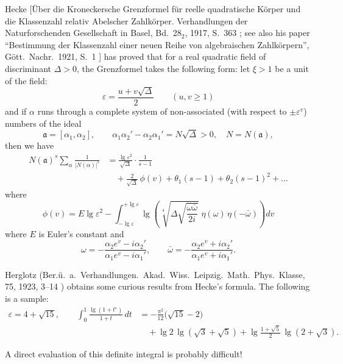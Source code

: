 Hecke [\"Uber die Kroneckersche Grenzformel f\"ur reelle quadratische
K\"orper und die Klassenzahl relativ Abelscher Zahlk\"orper.
Verhandlungen der Naturforschenden Gesellschaft in Basel, Bd.\ 28$_{2}$,
1917, S.~363 \cite{hecke1917kroneckersche}; see also his paper
``Bestimmung der Klassenzahl einer neuen Reihe von algebraischen
Zahlk\"orpern'', G\"ott.\ Nachr.\ 1921, S.~1 \cite{hecke1921bestimmung}]
has proved that for a real quadratic field of discriminant $\Delta>0$,
the Grenzformel takes the following form: let $\xi>1$ be a unit of the
field:
\[
\varepsilon=\frac{u+v\sqrt{\Delta}}{2}\qquad(u,v\geq 1)
\]
and if $\alpha$ runs through a complete system of non-associated (with
respect to $\pm\varepsilon^{v}$) numbers of the ideal
\[
\mathfrak{a}=[\alpha_{1},\alpha_{2}],\qquad
\alpha_{1}\alpha_{2}'-\alpha_{2}\alpha_{1}'=N\sqrt{\Delta}>0,\quad
N=N(\mathfrak{a}),
\]
then we have
\[
\begin{aligned}
N(\mathfrak{a})^{s}\sum_{\alpha}\frac{1}{|N(\alpha)|^{s}}
&=\frac{\lg\varepsilon^{2}}{\sqrt{\Delta}}\cdot\frac{1}{s-1}\\
&\quad+\frac{2}{\sqrt{\Delta}}\,\phi(v)+\theta_{1}(s-1)
+\theta_{2}(s-1)^{2}+\dots
\end{aligned}
\]
where
\[
\phi(v)=E\lg\varepsilon^{2}
-\int_{-\lg\varepsilon}^{+\lg\varepsilon}
\lg\!\left(\sqrt[4]{\Delta\sqrt{\frac{\omega\bar{\omega}}{2i}}}\;
\eta(\omega)\,\eta(-\bar{\omega})\right)dv
\]
where $E$ is Euler's constant and
\[
\omega=-\frac{\alpha_{2}e^{v}-i\alpha_{2}'}{\alpha_{1}e^{v}-i\alpha_{1}'},
\qquad
\bar{\omega}=-\frac{\alpha_{2}e^{v}+i\alpha_{2}'}{\alpha_{1}e^{v}+i\alpha_{1}'}.
\]

Herglotz (Ber.\"u.\ a.\ Verhandlungen.\ Akad.\ Wiss.\ Leipzig.\ Math.\
Phys.\ Klasse, 75, 1923, 3--14 \cite{herglotz1923bestimmung}) obtains
some curious results from Hecke's formula. The following is a sample:
\[
\begin{aligned}
\varepsilon=4+\sqrt{15},\qquad
\int_{0}^{1}\frac{\lg(1+t^{\varepsilon})}{1+t}\,dt
&=-\frac{\pi^{2}}{12}\bigl(\sqrt{15}-2\bigr)\\
&\quad+\lg 2\,\lg(\sqrt{3}+\sqrt{5})
+\lg\frac{1+\sqrt{5}}{2}\,\lg(2+\sqrt{3}).
\end{aligned}
\]

A direct evaluation of this definite integral is probably difficult!
